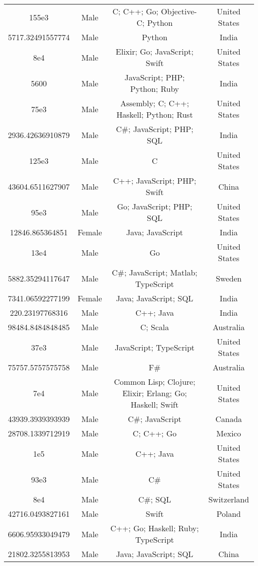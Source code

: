 \begin{center}
\begin{tabular}{ |c|c|c|c| }
155e3  &  Male  &  C; C++; Go; Objective-C; Python  &  United States  \\ 
5717.32491557774  &  Male  &  Python  &  India  \\ 
8e4  &  Male  &  Elixir; Go; JavaScript; Swift  &  United States  \\ 
5600  &  Male  &  JavaScript; PHP; Python; Ruby  &  India  \\ 
75e3  &  Male  &  Assembly; C; C++; Haskell; Python; Rust  &  United States  \\ 
2936.42636910879  &  Male  &  C\#; JavaScript; PHP; SQL  &  India  \\ 
125e3  &  Male  &  C  &  United States  \\ 
43604.6511627907  &  Male  &  C++; JavaScript; PHP; Swift  &  China  \\ 
95e3  &  Male  &  Go; JavaScript; PHP; SQL  &  United States  \\ 
12846.865364851  &  Female  &  Java; JavaScript  &  India  \\ 
13e4  &  Male  &  Go  &  United States  \\ 
5882.35294117647  &  Male  &  C\#; JavaScript; Matlab; TypeScript  &  Sweden  \\ 
7341.06592277199  &  Female  &  Java; JavaScript; SQL  &  India  \\ 
220.23197768316  &  Male  &  C++; Java  &  India  \\ 
98484.8484848485  &  Male  &  C; Scala  &  Australia  \\ 
37e3  &  Male  &  JavaScript; TypeScript  &  United States  \\ 
75757.5757575758  &  Male  &  F\#  &  Australia  \\ 
7e4  &  Male  &  Common Lisp; Clojure; Elixir; Erlang; Go; Haskell; Swift  &  United States  \\ 
43939.3939393939  &  Male  &  C\#; JavaScript  &  Canada  \\ 
28708.1339712919  &  Male  &  C; C++; Go  &  Mexico  \\ 
1e5  &  Male  &  C++; Java  &  United States  \\ 
93e3  &  Male  &  C\#  &  United States  \\ 
8e4  &  Male  &  C\#; SQL  &  Switzerland  \\ 
42716.0493827161  &  Male  &  Swift  &  Poland  \\ 
6606.95933049479  &  Male  &  C++; Go; Haskell; Ruby; TypeScript  &  India  \\ 
21802.3255813953  &  Male  &  Java; JavaScript; SQL  &  China  \\ 

\end{tabular}
\end{center}
